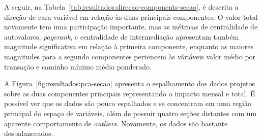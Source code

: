A seguir, na Tabela~\ref{tab:resultados:direcao-components-secao}, é descrita a direção de cara variável em relação às duas principais componentes. O valor total novamente tem uma participação importante, mas as métricas de centralidade de autovalores, \textit{pagerank}, e centralidade de intermediação apresentam também magnitude significativa em relação à primeira componente, enquanto as maiores magnitudes para a segundo componentes pertencem às váriáveis valor médio por transação e caminho mínimo médio ponderado.

A Figura~\ref{fig:resultados:pca-secao} apresenta o espalhamento dos dados projetos sobre as duas componentes principais representando o impacto mensal e total. É possível ver que os dados são pouco espalhados e se concentram em uma região principal do espaço de variáveis, além de possuir quatro seções distantes com um aparente comportamento de \textit{outliers}. Novamente, os dados são bastante desbalanceados.

